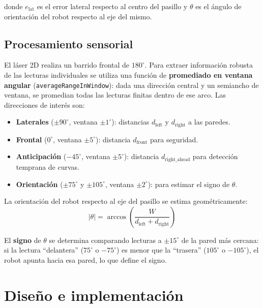 \documentclass[12pt]{article}
\begin{document}
donde $e_\text{lat}$ es el error lateral respecto al centro del pasillo y $\theta$ es el \'{a}ngulo de orientaci\'{o}n del robot respecto al eje del mismo.

\subsection{Procesamiento sensorial}
El l\'{a}ser 2D realiza un barrido frontal de $180^\circ$. Para extraer informaci\'{o}n robusta de las lecturas individuales se utiliza una funci\'{o}n de \textbf{promediado en ventana angular} (\texttt{averageRangeInWindow}): dada una direcci\'{o}n central y un semiancho de ventana, se promedian todas las lecturas finitas dentro de ese arco. Las direcciones de inter\'{e}s son:

\begin{itemize}[leftmargin=2em]
  \item \textbf{Laterales} ($\pm 90^\circ$, ventana $\pm 1^\circ$): distancias $d_\text{left}$ y $d_\text{right}$ a las paredes.
  \item \textbf{Frontal} ($0^\circ$, ventana $\pm 5^\circ$): distancia $d_\text{front}$ para seguridad.
  \item \textbf{Anticipaci\'{o}n} ($-45^\circ$, ventana $\pm 5^\circ$): distancia $d_\text{right\_ahead}$ para detecci\'{o}n temprana de curvas.
  \item \textbf{Orientaci\'{o}n} ($\pm 75^\circ$ y $\pm 105^\circ$, ventana $\pm 2^\circ$): para estimar el signo de $\theta$.
\end{itemize}

La orientaci\'{o}n del robot respecto al eje del pasillo se estima geom\'{e}tricamente:
\begin{equation}
  |\theta| = \arccos\!\left(\frac{W}{d_\text{left} + d_\text{right}}\right)
  \label{eq:theta_mag}
\end{equation}

El \textbf{signo} de $\theta$ se determina comparando lecturas a $\pm 15^\circ$ de la pared m\'{a}s cercana: si la lectura ``delantera'' ($75^\circ$ o $-75^\circ$) es menor que la ``trasera'' ($105^\circ$ o $-105^\circ$), el robot apunta hacia esa pared, lo que define el signo.


\section{Dise\~{n}o e implementaci\'{o}n}
\end{document}
